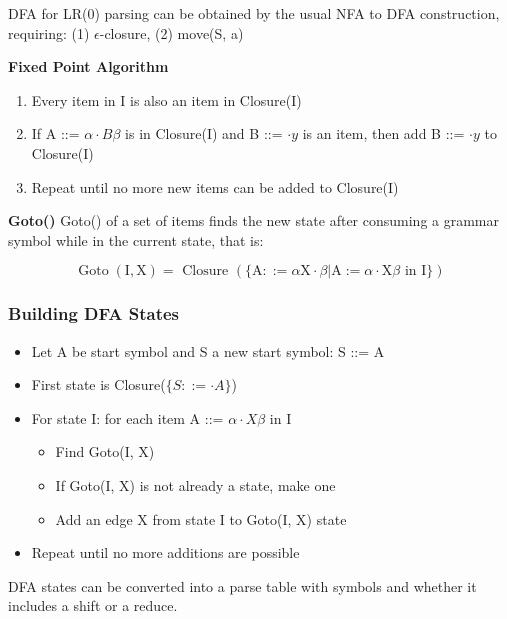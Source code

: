 \documentclass{article}
\begin{document}
 DFA for LR(0) parsing can be obtained by the usual NFA to DFA construction, requiring: (1) $\epsilon$-closure, (2) move(S, a)
 
 \bigskip
 \noindent
 \textbf{Fixed Point Algorithm}
 \begin{enumerate}
 	\item Every item in I is also an item in Closure(I)
 	\item If A ::= $\alpha \cdot B \beta$ is in Closure(I) and B ::= $\cdot y$ is an item, then add B ::= $\cdot y$ to Closure(I)
 	\item Repeat until no more new items can be added to Closure(I)
 \end{enumerate}

\bigskip
\noindent
\textbf{Goto()}
Goto() of a set of items finds the new state after consuming a grammar symbol while in the current state, that is:

\begin{equation}
\operatorname{Goto}(\mathrm{I}, \mathrm{X})=\text { Closure }(\{\mathrm{A} : :=\alpha \mathrm{X} \cdot \beta | \mathrm{A} :=\alpha \cdot \mathrm{X} \beta \text { in } \mathrm{I}\})
\end{equation}



\subsubsection{Building DFA States}
\begin{itemize}
	\item Let A be start symbol and S a new start symbol: S ::= A
	\item First state is Closure($\{      S ::= \cdot A           \}$)
	\item For state I: for each item A ::= $\alpha \cdot X \beta$ in I
	\begin{itemize}
		\item Find Goto(I, X)
		\item If Goto(I, X) is not already a state, make one
		\item Add an edge X from state I to Goto(I, X) state
	\end{itemize}
	\item Repeat until no more additions are possible
\end{itemize}

DFA states can be converted into a parse table with symbols and whether it includes a shift or a reduce.
\end{document}
